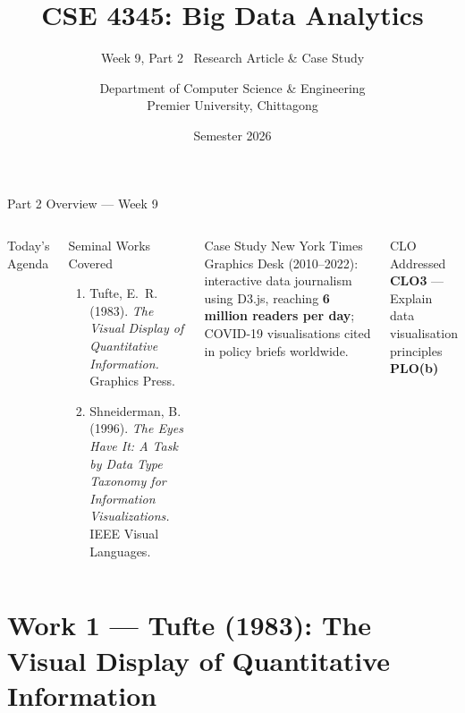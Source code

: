 \documentclass[aspectratio=169,10pt]{beamer}
\title[CSE 4345 \textbar{} Week 9, Part 2]{CSE 4345: Big Data Analytics}
\subtitle{Week 9, Part 2 \textemdash\ Research Article \& Case Study}
\author[Dept.\ of CSE]{Department of Computer Science \& Engineering\\[4pt]
       \small Premier University, Chittagong}
\institute{}
\date{Semester 2026}
\begin{document}

\begin{frame}
  \titlepage
\end{frame}

\begin{frame}{Part 2 Overview — Week 9}
  \begin{columns}[T]
      \begin{block}{Today's Agenda}
        \tableofcontents
      \end{block}
      \begin{exampleblock}{Seminal Works Covered}
        \begin{enumerate}
          \item Tufte, E.~R. (1983).
                \textit{The Visual Display of Quantitative
                Information.} Graphics Press.
          \item Shneiderman, B. (1996).
                \textit{The Eyes Have It: A Task by Data Type
                Taxonomy for Information Visualizations.}
                IEEE Visual Languages.
        \end{enumerate}
      \end{exampleblock}
      \vspace{6pt}
      \begin{alertblock}{Case Study}
        New York Times Graphics Desk (2010--2022):
        interactive data journalism using D3.js, reaching
        \textbf{6 million readers per day}; COVID-19
        visualisations cited in policy briefs worldwide.
      \end{alertblock}
      \vspace{4pt}
      \begin{block}{CLO Addressed}
        \textbf{CLO3} — Explain data visualisation principles\\
        \textbf{PLO(b)}
      \end{block}
  \end{columns}
\end{frame}

\section{Work 1 — Tufte (1983): The Visual Display of Quantitative Information}
\end{document}
